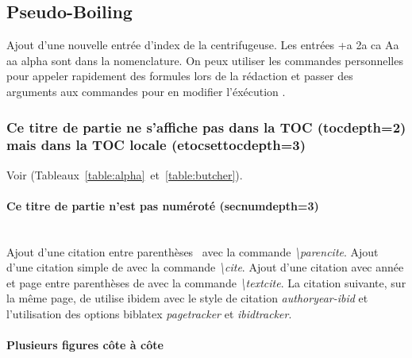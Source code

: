 	\subsection{Pseudo-Boiling} %

		Ajout d'une nouvelle entrée d'index de la centrifugeuse. Les entrées \gls{+a} \gls{2a} \gls{ca} \gls{Aa} \gls{aa} \gls{alpha} {\NoAutoSpaceBeforeFDP}sont dans la nomenclature. On peux utiliser les commandes personnelles pour appeler rapidement des formules lors de la rédaction \acc et passer des arguments aux commandes pour en modifier l'éxécution \emiss[\nu]{\Omega}.
		
		\subsubsection{Ce titre de partie ne s'affiche pas dans la TOC (tocdepth=2) mais dans la TOC locale (etocsettocdepth=3)}

			Voir (Tableaux~\ref{table:alpha}~et~\ref{table:butcher}).

			\paragraph{Ce titre de partie n'est pas numéroté (secnumdepth=3)}~~\\ %

				Ajout d'une citation entre parenthèses~\parencite{godard_borreliose_2012} avec la commande \textit{\textbackslash parencite}. Ajout d'une citation simple de \cite{zohdy_mapping_2012} avec la commande \textit{\textbackslash cite}. Ajout d'une citation avec année et page entre parenthèses de \textcite[9]{godard_borreliose_2012} avec la commande \textit{\textbackslash textcite}. La citation suivante, sur la même page, de \textcite[12]{godard_borreliose_2012} utilise ibidem avec le style de citation \textit{authoryear-ibid} et l'utilisation des options biblatex \textit{pagetracker} et \textit{ibidtracker}.

			\paragraph{Plusieurs figures côte à côte}~~\\

